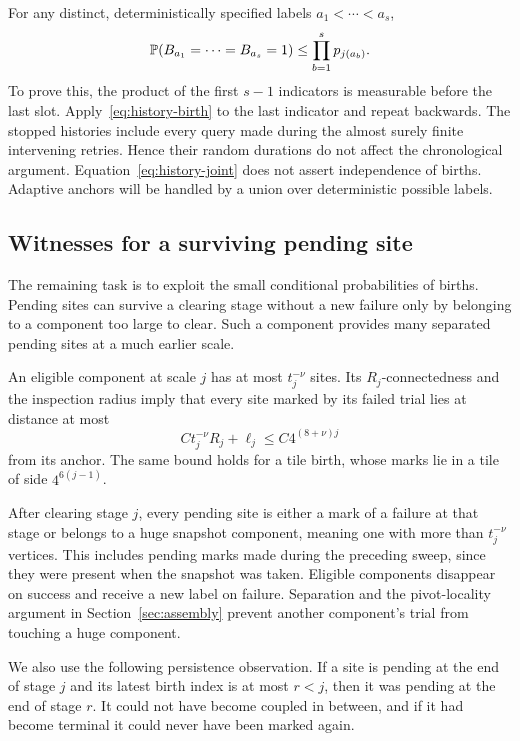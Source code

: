 For any distinct, deterministically specified labels $a_1<\cdots<a_s$,
\begin{equation}
 \mathbb P(B_{a_1}=\cdots=B_{a_s}=1)
 \le\prod_{b=1}^s p_{j(a_b)}.
 \label{eq:history-joint}
\end{equation}
To prove this, the product of the first $s-1$ indicators is measurable
before the last slot. Apply~\eqref{eq:history-birth} to the last indicator
and repeat backwards. The stopped histories include every query made
during the almost surely finite intervening retries. Hence their random
durations do not affect the chronological argument.
Equation~\eqref{eq:history-joint} does not assert independence of births.
Adaptive anchors will be handled by a union over deterministic possible
labels.

\subsection{Witnesses for a surviving pending site}

The remaining task is to exploit the small conditional probabilities of
births.  Pending sites can survive a clearing stage without a new failure
only by belonging to a component too large to clear.  Such a component
provides many separated pending sites at a much earlier scale.

An eligible component at scale $j$ has at most $t_j^{-\nu}$ sites.  Its
$R_j$-connectedness and the inspection radius imply that every site marked
by its failed trial lies at distance at most
\begin{equation}
 C t_j^{-\nu}R_j+\ell_j\le C4^{(8+\nu)j}
 \label{eq:history-mark-radius}
\end{equation}
from its anchor.  The same bound holds for a tile birth, whose marks lie in
a tile of side $4^{6(j-1)}$.

After clearing stage $j$, every pending site is either a mark of a failure
at that stage or belongs to a huge snapshot component, meaning one with
more than $t_j^{-\nu}$ vertices.  This includes pending marks made during
the preceding sweep, since they were present when the snapshot was taken.
Eligible components disappear on success and receive a new label on
failure. Separation and the pivot-locality argument in
Section~\ref{sec:assembly} prevent another component's trial from touching
a huge component.

We also use the following persistence observation.  If a site is pending
at the end of stage $j$ and its latest birth index is at most $r<j$, then it
was pending at the end of stage $r$.  It could not have become coupled in
between, and if it had become terminal it could never have been marked
again.

